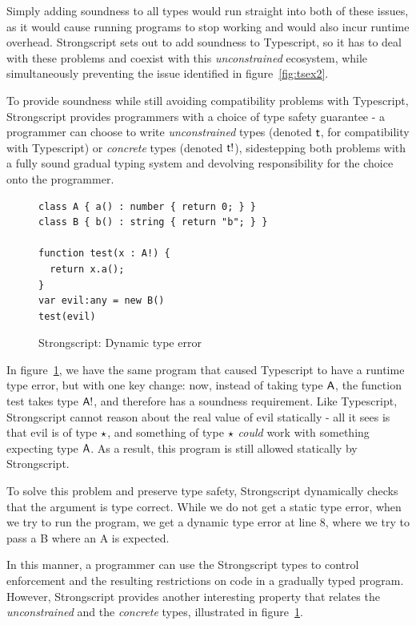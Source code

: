 \documentclass[a4paper,USenglish]{tex/lipics-v2016}
\begin{document}
Simply adding soundness to all types would run straight into both of these
issues, as it would cause running programs to stop working and would 
also incur runtime overhead. Strongscript sets out to add soundness to
Typescript, so it has to deal with these problems and coexist with this
\emph{unconstrained} ecosystem, while simultaneously preventing the issue
identified in figure~\ref{fig:tsex2}.

To provide soundness while still avoiding compatibility problems with 
Typescript, Strongscript provides programmers with a choice of type
safety guarantee - a programmer can choose to write \emph{unconstrained}
types (denoted ${\sf{t}}$, for compatibility with Typescript) or \emph{concrete}
types (denoted ${\sf{t}}{\sf{!}}$), sidestepping both problems with a fully sound
gradual typing system and devolving responsibility for the choice onto
the programmer.

\begin{figure}[h]
\begin{verbatim}
class A { a() : number { return 0; } }
class B { b() : string { return "b"; } }

function test(x : A!) {
  return x.a();
}
var evil:any = new B()
test(evil)
\end{verbatim}
\caption{Strongscript: Dynamic type error}
\label{fig:ssex}
\end{figure}

In figure~\ref{fig:ssex}, we have the same program that caused Typescript to
have a runtime type error, but with one key change: now, instead of taking
type ${\sf{A}}$, the function test takes type ${\sf{A!}}$, and therefore has a
soundness requirement. Like Typescript, Strongscript cannot reason about the
real value of evil statically - all it sees is that evil is of type $\star$,
and something of type $\star$ \emph{could} work with something expecting type
${\sf{A}}$. As a result, this program is still allowed statically by
Strongscript.

To solve this problem and preserve type safety, Strongscript dynamically
checks that the argument is type correct. While we do not get a static type
error, when we try to run the program, we get a dynamic type error at line
8, where we try to pass a B where an A is expected.

In this manner, a programmer can use the Strongscript types to control
enforcement and the resulting restrictions on code in a gradually typed
program. However, Strongscript provides another interesting property that
relates the \emph{unconstrained} and the \emph{concrete} types, illustrated
in figure~\ref{fig:ssex}.
\end{document}
